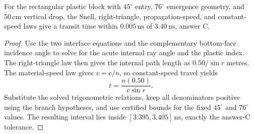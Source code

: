 \begin{theorem}
\label{thm:physics:phyx_mini_0023:target}
For the rectangular plastic block with \(45^\circ\) entry, \(76^\circ\)
emergence geometry, and \(50\,\mathrm{cm}\) vertical drop, the Snell,
right-triangle, propagation-speed, and constant-speed laws give a transit
time within \(0.005\,\mathrm{ns}\) of \(3.40\,\mathrm{ns}\), answer C.
\end{theorem}
\begin{proof}
Use the two interface equations and the complementary bottom-face incidence
angle to solve for the acute internal ray angle and the plastic index.  The
right-triangle law then gives the internal path length as
\(0.50/\sin r\) metres.  The material-speed law gives
\(v=c/n\), so constant-speed travel yields
\[
 t=\frac{n(0.50)}{c\sin r}.
\]
Substitute the solved trigonometric relations, keep all denominators positive
using the branch hypotheses, and use certified bounds for the fixed
\(45^\circ\) and \(76^\circ\) values.  The resulting interval lies inside
\([3.395,3.405]\,\mathrm{ns}\), exactly the answer-C tolerance.
\end{proof}

